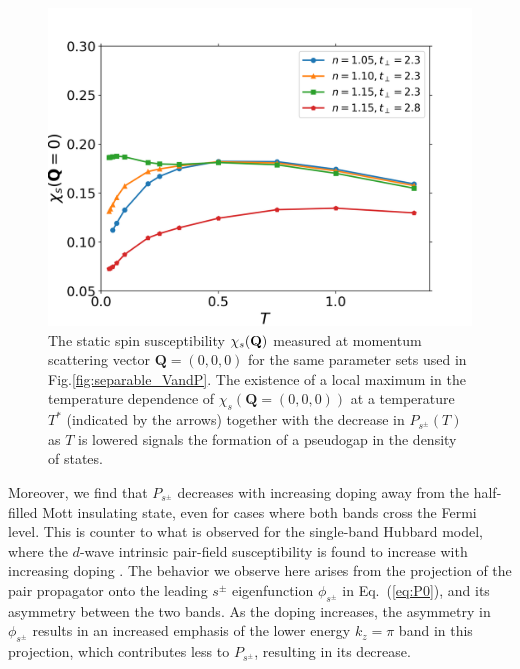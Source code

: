 \documentclass[prb,twocolumn,amsmath,amssymb,superscriptaddress,floatfix,nofootinbib]{revtex4-2}
\begin{document}
\begin{figure}[t]
\centering
\includegraphics[scale=0.4]{suscept_q000.png}
\caption{The static spin susceptibility $\chi_s({\bf Q})$ measured at momentum scattering vector $\mathbf{Q}=(0,0,0)$ for the same parameter sets used in Fig.\ref{fig:separable_VandP}. The existence of a local maximum in the temperature dependence of $\chi_s(\mathbf{Q}=(0,0,0))$ at a temperature $T^*$ (indicated by the arrows) together with the decrease in $P_{s^\pm}(T)$ as $T$ is lowered  signals the formation of a pseudogap in the density of states.}
\label{fig:spinsusQ0}
\end{figure}

Moreover, we find that $P_{s^\pm}$ decreases with increasing doping away from the half-filled Mott insulating state, even for cases where both bands cross the Fermi level. This is counter to what is observed for the single-band Hubbard model, where the $d$-wave intrinsic pair-field susceptibility is found to increase with increasing doping \cite{Maier2016, Maier2018}. The behavior we observe here arises from the projection of the pair propagator onto the leading $s^\pm$ eigenfunction $\phi_{s^\pm}$ in Eq.~(\ref{eq:P0}), and its asymmetry between the two bands. As the doping increases, the asymmetry in $\phi_{s^\pm}$ results in an increased emphasis of the lower energy $k_z = \pi$ band in this projection, which contributes less to $P_{s^\pm}$, resulting in its decrease.
\end{document}
